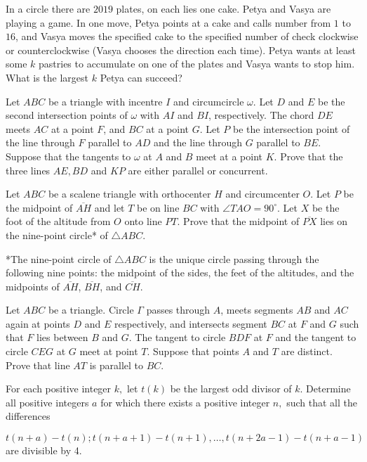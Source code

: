 \documentclass[11pt]{scrartcl}
\begin{document}
\begin{problem}[813804034055493]
In a circle there are $2019$ plates, on each lies one cake. Petya and Vasya are playing a game. In one move, Petya points at a cake and calls number from $1$ to $16$, and Vasya moves the specified cake to the specified number of
check clockwise or counterclockwise (Vasya chooses the direction each time). Petya wants at least some $k$ pastries to accumulate on one of the plates and Vasya wants to stop him. What is the largest $k$ Petya can succeed?
\end{problem}
\begin{problem}[315251261850257]
Let $ABC$ be a triangle with incentre $I$ and circumcircle $\omega$. Let $D$ and $E$ be the second intersection points of $\omega$ with $AI$ and $BI$, respectively. The chord $DE$ meets $AC$ at a point $F$, and $BC$ at a point $G$. Let $P$ be the intersection point of the line through $F$ parallel to $AD$ and the line through $G$ parallel to $BE$. Suppose that the tangents to $\omega$ at $A$ and $B$ meet at a point $K$. Prove that the three lines $AE,BD$ and $KP$ are either parallel or concurrent.
\end{problem}
\begin{problem}[528087142744727]
	Let $ABC$ be a scalene triangle with orthocenter $H$ and circumcenter $O$. Let $P$ be the midpoint of $\overline{AH}$ and let $T$ be on line $BC$ with $\angle TAO=90^{\circ}$. Let $X$ be the foot of the altitude from $O$ onto line $PT$. Prove that the midpoint of $\overline{PX}$ lies on the nine-point circle* of $\triangle ABC$.

*The nine-point circle of $\triangle ABC$ is the unique circle passing through the following nine points: the midpoint of the sides, the feet of the altitudes, and the midpoints of $\overline{AH}$, $\overline{BH}$, and $\overline{CH}$.
\end{problem}
\begin{problem}[797215984506934]
	Let $ABC$ be a triangle. Circle $\Gamma$ passes through $A$, meets segments $AB$ and $AC$ again at points $D$ and $E$ respectively, and intersects segment $BC$ at $F$ and $G$ such that $F$ lies between $B$ and $G$. The tangent to circle $BDF$ at $F$ and the tangent to circle $CEG$ at $G$ meet at point $T$. Suppose that points $A$ and $T$ are distinct. Prove that line $AT$ is parallel to $BC$.
\end{problem}
\begin{problem}[960400012939961]
For each positive integer $k,$ let $t(k)$ be the largest odd divisor of $k.$ Determine all positive integers $a$ for which there exists a positive integer $n,$ such that all the differences

\[t(n+a)-t(n); t(n+a+1)-t(n+1), \ldots, t(n+2a-1)-t(n+a-1)\]are divisible by 4.
\end{problem}
\end{document}
